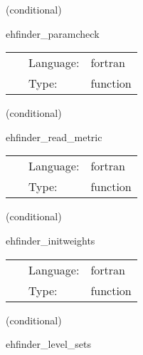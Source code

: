    (conditional) 

\hspace{5mm} ehfinder\_paramcheck 

\hspace{5mm}{\it check parameters } 


\hspace{5mm}

 \begin{tabular*}{160mm}{cll} 
~ & Language:  & fortran \\ 
~ & Type:  & function \\ 
\end{tabular*} 


\vspace{5mm}

   (conditional) 

\hspace{5mm} ehfinder\_read\_metric 

\hspace{5mm}{\it read in metric from file } 


\hspace{5mm}

 \begin{tabular*}{160mm}{cll} 
~ & Language:  & fortran \\ 
~ & Type:  & function \\ 
\end{tabular*} 


\vspace{5mm}

   (conditional) 

\hspace{5mm} ehfinder\_initweights 

\hspace{5mm}{\it setup weights for simpson integration } 


\hspace{5mm}

 \begin{tabular*}{160mm}{cll} 
~ & Language:  & fortran \\ 
~ & Type:  & function \\ 
\end{tabular*} 


\vspace{5mm}

   (conditional) 

\hspace{5mm} ehfinder\_level\_sets 

